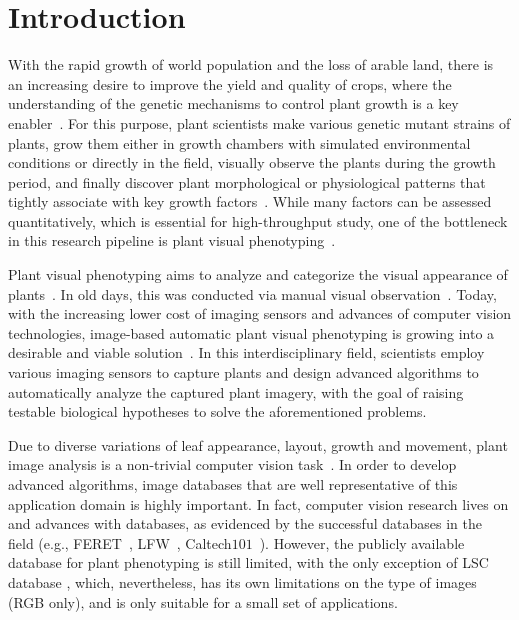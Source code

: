 \section{Introduction}
\label{sec:intro}

With the rapid growth of world population  and the loss of arable land, there is an increasing desire to improve the yield and quality of crops, where the understanding of the genetic mechanisms to control plant growth is a key enabler~\cite{doos2002population}.
%
For this purpose, plant scientists make various genetic mutant strains of plants, grow them either in  growth chambers with simulated environmental conditions or directly in the field, visually observe the plants during the growth period, and finally discover plant morphological or physiological patterns that tightly associate with key growth factors~\cite{houle2010phenomics}.
%
While many factors can be assessed quantitatively, which is essential for high-throughput study, one of the bottleneck in this research pipeline is plant visual phenotyping~\cite{walter2015plant}.

Plant visual phenotyping aims to analyze and categorize the visual appearance of plants~\cite{}. In old days, this was conducted via manual visual observation~\cite{Erblichkeit1903}. Today, with the increasing lower cost of imaging sensors and advances of computer vision technologies, image-based automatic plant visual phenotyping is growing into a desirable and viable solution~\cite{cruz2015depi}. In this interdisciplinary field, scientists employ various imaging sensors to capture plants and design advanced algorithms to automatically analyze the captured plant imagery, with the goal of raising testable biological hypotheses to solve the aforementioned problems.

Due to diverse variations of leaf appearance, layout, growth and movement, plant image analysis is a non-trivial computer vision task~\cite{}. In order to develop advanced algorithms, image databases that are well representative of this application domain is highly important. In fact, computer vision research lives on and advances with databases, as evidenced by the successful databases in the field (e.g., FERET~\cite{Phillips2000}, LFW~\cite{LFW}, Caltech$101$~\cite{Fei-Fei2004}). However, the publicly available database for plant phenotyping is still limited, with the only exception of LSC database \cite{scharr2014annotated}, which, nevertheless, has its own limitations on the type of images (RGB only), and is only suitable for a small set of applications.

